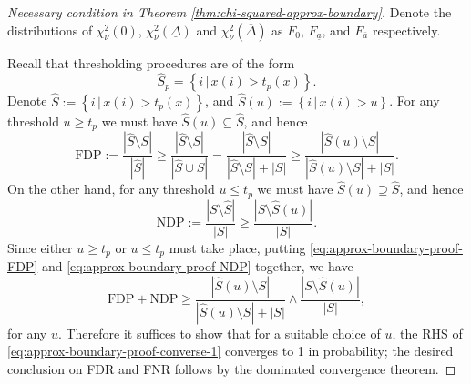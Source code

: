 \begin{proof}[Necessary condition in Theorem \ref{thm:chi-squared-approx-boundary}]
Denote the distributions of $\chi^2_\nu(0)$, $\chi^2_\nu(\underline{\Delta})$ and $\chi^2_\nu(\overline{\Delta})$ as $F_0$, $F_{\underline{a}}$, and $F_{\overline{a}}$ respectively.


Recall that thresholding procedures are of the form
$$
\widehat{S}_p = \left\{i\,|\,x(i) > t_p(x)\right\}.
$$
Denote $\widehat{S} := \left\{i\,|\,x(i) > t_p(x)\right\}$, and $\widehat{S}(u) := \left\{i\,|\,x(i) > u\right\}$.
For any threshold $u\ge t_p$ we must have $\widehat{S}(u)\subseteq\widehat{S}$, and hence
\begin{equation} \label{eq:approx-boundary-proof-FDP}
    \text{FDP} := \frac{|\widehat{S}\setminus{S}|}{|\widehat{S}|} \ge \frac{|\widehat{S}\setminus{S}|}{|\widehat{S}\cup{S}|} = \frac{|\widehat{S}\setminus{S}|}{|\widehat{S}\setminus{S}| + |S|} \ge
    \frac{|\widehat{S}(u)\setminus{S}|}{|\widehat{S}(u)\setminus{S}| + |S|}.
\end{equation}
On the other hand, for any threshold $u\le t_p$ we must have $\widehat{S}(u)\supseteq\widehat{S}$, and hence
\begin{equation} \label{eq:approx-boundary-proof-NDP}
    \text{NDP} := \frac{|{S}\setminus\widehat{S}|}{|{S}|} \ge 
    \frac{|{S}\setminus\widehat{S}(u)|}{|{S}|}.
\end{equation}
Since either $u\ge t_p$ or  $u\le t_p$ must take place, putting \eqref{eq:approx-boundary-proof-FDP} and \eqref{eq:approx-boundary-proof-NDP} together, we have
\begin{equation} \label{eq:approx-boundary-proof-converse-1}
    \text{FDP} + \text{NDP} 
    \ge \frac{|\widehat{S}(u)\setminus{S}|}{|\widehat{S}(u)\setminus{S}|+|{S}|} \wedge \frac{|{S}\setminus\widehat{S}(u)|}{|{S}|},
\end{equation}
for any $u$.
Therefore it suffices to show that for a suitable choice of $u$, the RHS of \eqref{eq:approx-boundary-proof-converse-1} converges to 1 in probability; the desired conclusion on FDR and FNR follows by the dominated convergence theorem.


\end{proof}
